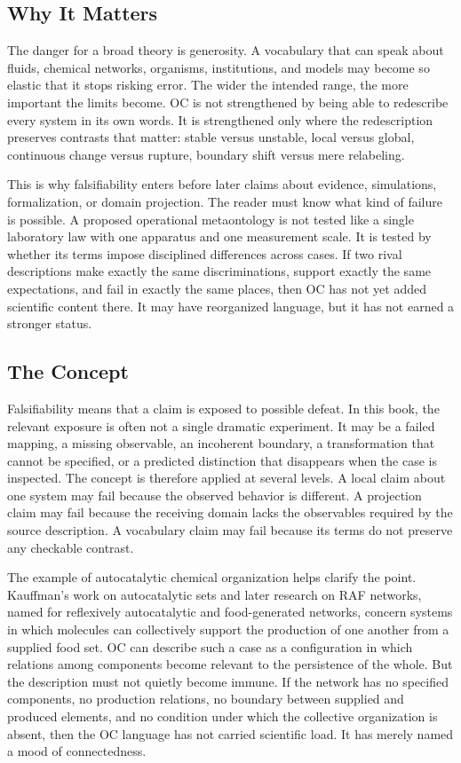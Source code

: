 \documentclass[11pt,a4paper,openany]{book}
\begin{document}
\subsection{Why It Matters}
The danger for a broad theory is generosity. A vocabulary that can speak about fluids, chemical networks, organisms, institutions, and models may become so elastic that it stops risking error. The wider the intended range, the more important the limits become. OC is not strengthened by being able to redescribe every system in its own words. It is strengthened only where the redescription preserves contrasts that matter: stable versus unstable, local versus global, continuous change versus rupture, boundary shift versus mere relabeling. \cite{haken_synergetics,nicolis_prigogine_selforg}\par
This is why falsifiability enters before later claims about evidence, simulations, formalization, or domain projection. The reader must know what kind of failure is possible. A proposed operational metaontology is not tested like a single laboratory law with one apparatus and one measurement scale. It is tested by whether its terms impose disciplined differences across cases. If two rival descriptions make exactly the same discriminations, support exactly the same expectations, and fail in exactly the same places, then OC has not yet added scientific content there. It may have reorganized language, but it has not earned a stronger status.\par
\subsection{The Concept}
Falsifiability means that a claim is exposed to possible defeat. In this book, the relevant exposure is often not a single dramatic experiment. It may be a failed mapping, a missing observable, an incoherent boundary, a transformation that cannot be specified, or a predicted distinction that disappears when the case is inspected. The concept is therefore applied at several levels. A local claim about one system may fail because the observed behavior is different. A projection claim may fail because the receiving domain lacks the observables required by the source description. A vocabulary claim may fail because its terms do not preserve any checkable contrast. \cite{haken_synergetics,nicolis_prigogine_selforg}\par
The example of autocatalytic chemical organization helps clarify the point. Kauffman's work on autocatalytic sets and later research on RAF networks, named for reflexively autocatalytic and food-generated networks, concern systems in which molecules can collectively support the production of one another from a supplied food set. OC can describe such a case as a configuration in which relations among components become relevant to the persistence of the whole. But the description must not quietly become immune. If the network has no specified components, no production relations, no boundary between supplied and produced elements, and no condition under which the collective organization is absent, then the OC language has not carried scientific load. It has merely named a mood of connectedness.\par
\end{document}
